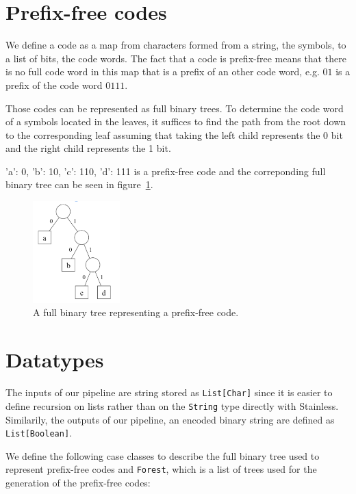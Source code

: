 \documentclass[a4paper,UKenglish,cleveref, autoref, thm-restate]{lipics-v2021}
\begin{document}
\section{Prefix-free codes}

We define a code as a map from characters formed from a string, the symbols, to a list of bits, the code words. The fact that a code is prefix-free means that there is no full code word in this map that is a prefix of an other code word, e.g. $01$ is a prefix of the code word $0111$.

Those codes can be represented as full binary trees. To determine the code word of a symbols located in the leaves, it suffices to find the path from the root down to the corresponding leaf assuming that taking the left child represents the 0 bit and the right child represents the 1 bit.

{'a': 0, 'b': 10, 'c': 110, 'd': 111} is a prefix-free code and the correponding full binary tree can be seen in figure~\ref{fig:pfc}.
\begin{figure}[ht]
    \centering
    \includegraphics[width=0.3\textwidth]{pfc.png}
    \caption{A full binary tree representing a prefix-free code.\label{fig:pfc}}
\end{figure}

\section{Datatypes}

The inputs of our pipeline are string stored as \lstinline{List[Char]} since it is easier to define recursion on lists rather than on the \lstinline{String} type directly with Stainless. 
Similarily, the outputs of our pipeline, an encoded binary string are defined as \lstinline{List[Boolean]}.

We define the following case classes to describe the full binary tree used to represent prefix-free codes and \lstinline{Forest}, which is a list of trees used for the generation of the prefix-free codes:
\end{document}
